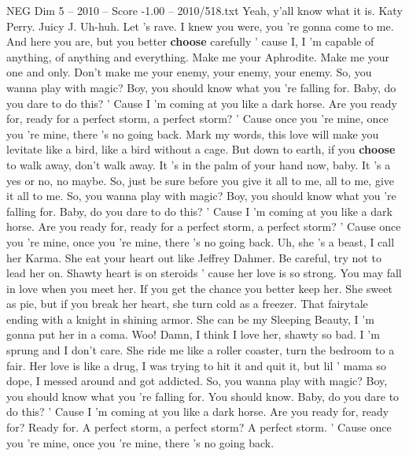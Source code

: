 \begin{textsample}{NEG Dim 5 – 2010 – Score -1.00 – 2010/518.txt}  \label{ex:f5_neg_012}
Yeah, y'all know what it is.
Katy Perry.
Juicy J.
Uh-huh.
Let 's rave.
I knew you were, you 're gonna come to me.
And here you are, but you better \textbf{choose} carefully ' cause I, I 'm capable of anything, of anything and everything.
Make me your Aphrodite.
Make me your one and only.
Don't make me your enemy, your enemy, your enemy.
So, you wanna play with magic?
Boy, you should know what you 're falling for.
Baby, do you dare to do this? ' Cause I 'm coming at you like a dark horse.
Are you ready for, ready for a perfect storm, a perfect storm? ' Cause once you 're mine, once you 're mine, there 's no going back.
Mark my words, this love will make you levitate like a bird, like a bird without a cage.
But down to earth, if you \textbf{choose} to walk away, don't walk away.
It 's in the palm of your hand now, baby.
It 's a yes or no, no maybe.
So, just be sure before you give it all to me, all to me, give it all to me.
So, you wanna play with magic?
Boy, you should know what you 're falling for.
Baby, do you dare to do this? ' Cause I 'm coming at you like a dark horse.
Are you ready for, ready for a perfect storm, a perfect storm? ' Cause once you 're mine, once you 're mine, there 's no going back.
Uh, she 's a beast, I call her Karma.
She eat your heart out like Jeffrey Dahmer.
Be careful, try not to lead her on.
Shawty heart is on steroids ' cause her love is so strong.
You may fall in love when you meet her.
If you get the chance you better keep her.
She sweet as pie, but if you break her heart, she turn cold as a freezer.
That fairytale ending with a knight in shining armor.
She can be my Sleeping Beauty, I 'm gonna put her in a coma.
Woo!
Damn, I think I love her, shawty so bad.
I 'm sprung and I don't care.
She ride me like a roller coaster, turn the bedroom to a fair.
Her love is like a drug, I was trying to hit it and quit it, but lil ' mama so dope, I messed around and got addicted.
So, you wanna play with magic?
Boy, you should know what you 're falling for.
You should know.
Baby, do you dare to do this? ' Cause I 'm coming at you like a dark horse.
Are you ready for, ready for?
Ready for.
A perfect storm, a perfect storm?
A perfect storm. ' Cause once you 're mine, once you 're mine, there 's no going back.

\end{textsample}
